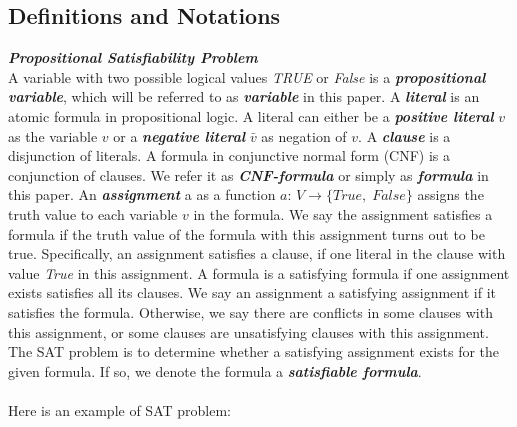 \documentclass[12pt,a4paper,twoside]{scrartcl}
\numberwithin{equation}{section}
\begin{document}
\subsection{Definitions and Notations} 
\emph{\textbf{Propositional Satisfiability Problem}}\\
A variable with two possible logical values  \textit{TRUE} or  \textit{False} is a \emph{\textbf{propositional variable}}, which will be referred to as \emph{\textbf{variable}} in this paper.     
A \emph{\textbf{literal}} is an atomic formula in propositional logic. A literal can either be a \emph{\textbf{positive literal}} $v$ as the variable $v$ or a \emph{\textbf{negative literal}} $\bar{v}$ as negation of $v$.
A \emph{\textbf{clause}} is a disjunction of literals. A formula in conjunctive normal form (CNF) is a conjunction of clauses. We refer it as  \emph{\textbf{CNF-formula}} or simply as \emph{\textbf{formula}} in this paper.
An \emph{\textbf{assignment}} a as a function  $a$: $V\rightarrow \{True {, }\; False\}$ assigns the truth value to each variable $v$ in the formula. We say the assignment satisfies a formula if the truth value of the formula with this assignment turns out to be true. Specifically, an assignment satisfies a clause, if one literal in the clause with value  \textit{True} in this assignment. A formula is a satisfying formula if one assignment exists satisfies all its clauses. We say an assignment a satisfying assignment if it satisfies the formula. Otherwise, we say there are conflicts in some clauses with this assignment, or some clauses are unsatisfying clauses with this assignment. 
The SAT problem is to determine whether a satisfying assignment exists for the given formula. If so, we denote the formula a \emph{\textbf{satisfiable formula}}. \\
\\
Here is an example of SAT problem:
\end{document}
